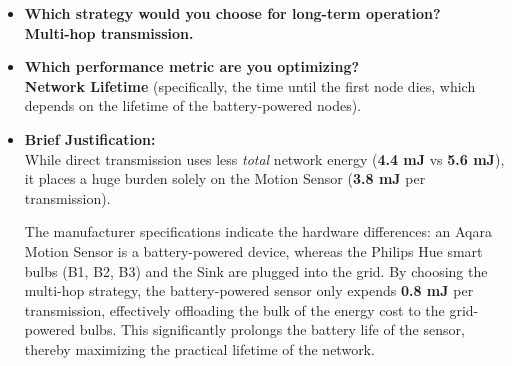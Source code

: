 \documentclass[11pt]{article}
\begin{document}
\begin{itemize}
    \item \textbf{Which strategy would you choose for long-term operation?}\\
    \textbf{Multi-hop transmission.}

    \item \textbf{Which performance metric are you optimizing?}\\
    \textbf{Network Lifetime} (specifically, the time until the first node dies, which depends on the lifetime of the battery-powered nodes).

    \item \textbf{Brief Justification:}\\
    While direct transmission uses less \textit{total} network energy (\textbf{4.4 mJ} vs \textbf{5.6 mJ}), it places a huge burden solely on the Motion Sensor (\textbf{3.8 mJ} per transmission). 
    
    The manufacturer specifications indicate the hardware differences: an Aqara Motion Sensor is a battery-powered device, whereas the Philips Hue smart bulbs (B1, B2, B3) and the Sink are plugged into the grid. By choosing the multi-hop strategy, the battery-powered sensor only expends \textbf{0.8 mJ} per transmission, effectively offloading the bulk of the energy cost to the grid-powered bulbs. This significantly prolongs the battery life of the sensor, thereby maximizing the practical lifetime of the network.
\end{itemize}
\end{document}
